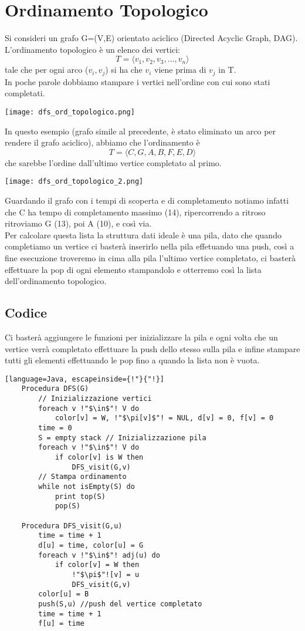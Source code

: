 \section{Ordinamento Topologico}
Si consideri un grafo G=(V,E) orientato aciclico (Directed Acyclic Graph, DAG).\\
L'ordinamento topologico è un elenco dei vertici:
\[ T = \langle v_1,v_2,v_3,...,v_n \rangle \]
tale che per ogni arco ($v_i, v_j$) si ha che $v_i$ viene prima di $v_j$ in T.\\
In poche parole dobbiamo stampare i vertici nell'ordine con cui sono stati completati.
\begin{center}
    \texttt{[image: dfs\_ord\_topologico.png]}
\end{center}
In questo esempio (grafo simile al precedente, è stato eliminato un arco per rendere il grafo
aciclico), abbiamo che l'ordinamento è 
\[ T = \langle C, G,A,B,F,E,D \rangle \]
che sarebbe l'ordine dall'ultimo vertice completato al primo.
\begin{center}
    \texttt{[image: dfs\_ord\_topologico\_2.png]}
\end{center}
Guardando il grafo con i tempi di scoperta e di completamento notiamo infatti che C
ha tempo di completamento massimo (14), ripercorrendo a ritroso ritroviamo G (13), poi
A (10), e così via.\\
Per calcolare questa lista la struttura dati ideale è una pila, dato che quando completiamo un vertice
ci basterà inserirlo nella pila effetuando una push, così a fine esecuzione troveremo in cima alla pila l'ultimo
vertice completato, ci basterà effettuare la pop di ogni elemento stampandolo e otterremo così
la lista dell'ordinamento topologico.\\
\subsection{Codice}
Ci basterà aggiungere le funzioni per inizializzare la pila e ogni volta che un vertice
verrà completato effettuare la push dello stesso sulla pila e infine stampare tutti gli elementi
effettuando le pop fino a quando la lista non è vuota.
\begin{lstlisting}[language=Java, escapeinside={!"}{"!}]
    Procedura DFS(G)
        // Inizializzazione vertici
        foreach v !"$\in$"! V do
            color[v] = W, !"$\pi[v]$"! = NUL, d[v] = 0, f[v] = 0
        time = 0
        S = empty stack // Inizializzazione pila
        foreach v !"$\in$"! V do
            if color[v] is W then
                DFS_visit(G,v)
        // Stampa ordinamento
        while not isEmpty(S) do 
            print top(S)
            pop(S)

    Procedura DFS_visit(G,u)
        time = time + 1
        d[u] = time, color[u] = G
        foreach v !"$\in$"! adj(u) do
            if color[v] = W then
                !"$\pi$"![v] = u
                DFS_visit(G,v)
        color[u] = B
        push(S,u) //push del vertice completato
        time = time + 1
        f[u] = time
\end{lstlisting}
